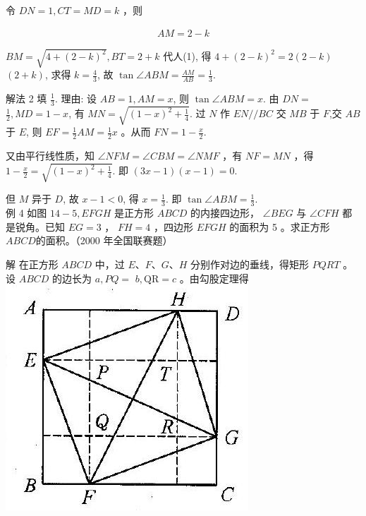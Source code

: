 \documentclass[10pt]{article}
\begin{document}
令 $D N=1, C T=M D=k$ ，则

\begin{align*}
A M=2-k
\end{align*}

$B M=\sqrt{4+(2-k)^{2}}, B T=2+k$ 代人(1), 得 $4+(2-k)^{2}=2(2-k)$ $(2+k)$, 求得 $k=\frac{4}{3}$, 故 $\tan \angle A B M=\frac{A M}{A B}=\frac{1}{3}$.

解法 2 填 $\frac{1}{3}$. 理由: 设 $A B=1, A M=x$, 则 $\tan \angle A B M=x$. 由 $D N=$ $\frac{1}{2}, M D=1-x$, 有 $M N=\sqrt{(1-x)^{2}+\frac{1}{4}}$. 过 $N$ 作 $E N / / B C$ 交 $M B$ 于 $F$,交 $A B$ 于 $E$, 则 $E F=\frac{1}{2} A M=\frac{1}{2} x$ 。从而 $F N=1-\frac{x}{2}$.

又由平行线性质，知 $\angle N F M=\angle C B M=\angle N M F$ ，有 $N F=M N$ ，得 $1-\frac{x}{2}=\sqrt{(1-x)^{2}+\frac{1}{4}}$. 即 $(3 x-1)(x-1)=0$.

但 $M$ 异于 $D$, 故 $x-1<0$, 得 $x=\frac{1}{3}$. 即 $\tan \angle A B M=\frac{1}{3}$.\\
例 4 如图 $14-5, E F G H$ 是正方形 $A B C D$ 的内接四边形， $\angle B E G$ 与 $\angle C F H$ 都是锐角。已知 $E G=3$ ， $F H=4$ ，四边形 $E F G H$ 的面积为 5 。求正方形 $A B C D$的面积。（2000 年全国联赛题）

解 在正方形 $A B C D$ 中，过 $E 、 F 、 G 、 H$ 分别作对边的垂线，得矩形 $P Q R T$ 。设 $A B C D$ 的边长为 $a, P Q=$ $b, \mathrm{QR}=c$ 。由勾股定理得\\
\includegraphics[max width=\textwidth, center]{2024_10_30_2c8f45efd4a519b08e1ag-129}
\end{document}
